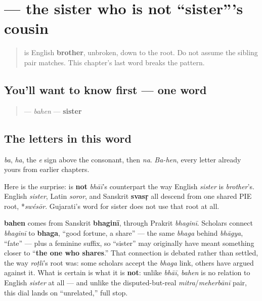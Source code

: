 \section[bahen]{ — the sister who is not \textquotedblleft{}sister\textquotedblright{}'s cousin}

\label{lesson:GU-C11-bahen}



\begin{quote}
\textbf{} is English \textbf{brother}, unbroken, down to the root. Do not assume the sibling pair matches. This chapter's last word breaks the pattern.
\end{quote}

\subsection*{You'll want to know first — one word}
\begin{quote}
\textbf{} — \emph{bahen} — \textbf{sister}
\end{quote}

\subsection*{The letters in this word}
\textbf{} \emph{ba}, \textbf{} \emph{ha}, \textbf{} the \emph{e} sign above the consonant, then \textbf{} \emph{na}. \emph{Ba-hen}, every letter already yours from earlier chapters.

\begin{cousinweb}
Here is the surprise: \textbf{} is \textbf{not} \emph{bhāī}'s counterpart the way English \emph{sister} is \emph{brother}'s. English \emph{sister}, Latin \emph{soror}, and Sanskrit \textbf{svasṛ} all descend from one shared PIE root, *\emph{swésōr}. Gujarati's word for sister does not use that root at all.

\textbf{bahen} comes from Sanskrit \textbf{bhaginī}, through Prakrit \emph{bhaginī}. Scholars connect \emph{bhaginī} to \textbf{bhaga}, \textquotedblleft{}good fortune, a share\textquotedblright{} — the same \emph{bhaga} behind \emph{bhāgya}, \textquotedblleft{}fate\textquotedblright{} — plus a feminine suffix, so \textquotedblleft{}sister\textquotedblright{} may originally have meant something closer to \textquotedblleft{}\textbf{the one who shares}.\textquotedblright{} That connection is debated rather than settled, the way \emph{roṭlī}'s root was: some scholars accept the \emph{bhaga} link, others have argued against it. What is certain is what it is \textbf{not}: unlike \emph{bhāī}, \emph{bahen} is no relation to English \emph{sister} at all — and unlike the disputed-but-real \emph{mitra}/\emph{meherbānī} pair, this dial lands on \textquotedblleft{}unrelated,\textquotedblright{} full stop.
\end{cousinweb}

